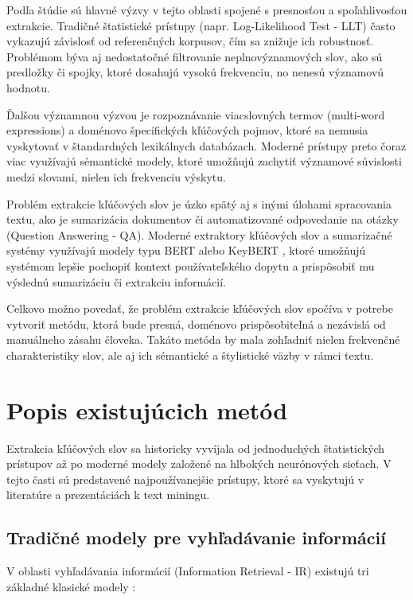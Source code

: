 \documentclass[a4paper,12pt]{article}
\begin{document}
Podľa štúdie \cite{rose2010automatic} sú hlavné výzvy v tejto oblasti spojené s presnosťou a spoľahlivosťou extrakcie. Tradičné štatistické prístupy (napr. Log-Likelihood Test - LLT) často vykazujú závislosť od referenčných korpusov, čím sa znižuje ich robustnosť. Problémom býva aj nedostatočné filtrovanie neplnovýznamových slov, ako sú predložky či spojky, ktoré dosahujú vysokú frekvenciu, no nenesú významovú hodnotu.

Ďalšou významnou výzvou je rozpoznávanie viacslovných termov (multi-word expressions) a doménovo špecifických kľúčových pojmov, ktoré sa nemusia vyskytovať v štandardných lexikálnych databázach. Moderné prístupy preto čoraz viac využívajú sémantické modely, ktoré umožňujú zachytiť významové súvislosti medzi slovami, nielen ich frekvenciu výskytu.

Problém extrakcie kľúčových slov je úzko spätý aj s inými úlohami spracovania textu, ako je sumarizácia dokumentov či automatizované odpovedanie na otázky (Question Answering - QA). Moderné extraktory kľúčových slov a sumarizačné systémy využívajú modely typu BERT alebo KeyBERT \cite{grootendorst2020keybert}, ktoré umožňujú systémom lepšie pochopiť kontext používateľského dopytu a prispôsobiť mu výslednú sumarizáciu či extrakciu informácií.

Celkovo možno povedať, že problém extrakcie kľúčových slov spočíva v potrebe vytvoriť metódu, ktorá bude presná, doménovo prispôsobiteľná a nezávislá od manuálneho zásahu človeka. Takáto metóda by mala zohľadniť nielen frekvenčné charakteristiky slov, ale aj ich sémantické a štylistické väzby v rámci textu.

\section{Popis existujúcich metód}

Extrakcia kľúčových slov sa historicky vyvíjala od jednoduchých štatistických prístupov až po moderné modely založené na hlbokých neurónových sieťach. V tejto časti sú predstavené najpoužívanejšie prístupy, ktoré sa vyskytujú v literatúre a prezentáciách k text miningu.

\subsection{Tradičné modely pre vyhľadávanie informácií}

V oblasti vyhľadávania informácií (Information Retrieval - IR) existujú tri základné klasické modely \cite{manning2008introduction}:
\end{document}
